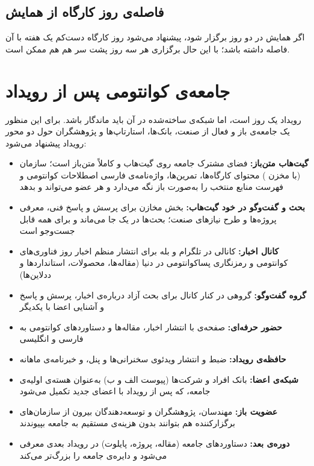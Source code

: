 \documentclass[a4paper,12pt]{article}
\begin{document}
	\subsection*{فاصله‌ی روز کارگاه از همایش}
	اگر همایش در دو روز برگزار شود، پیشنهاد می‌شود روز کارگاه دست‌کم یک هفته با آن فاصله داشته باشد؛
	با این حال برگزاری هر سه روز پشت سر هم هم ممکن است.

	\section{جامعه‌ی کوانتومی پس از رویداد}\label{sec:community}

	رویداد یک روز است، اما شبکه‌ی ساخته‌شده در آن باید ماندگار باشد. برای این منظور یک جامعه‌ی باز و فعال از صنعت، بانک‌ها،
	استارتاپ‌ها و پژوهشگران حول دو محور رویداد پیشنهاد می‌شود:
	\begin{itemize}[rightmargin=0.5cm, itemsep=4pt]
		\item \textbf{گیت‌هاب متن‌باز:} فضای مشترک جامعه روی گیت‌هاب و کاملاً متن‌باز است؛ سازمان  (با مخزن )
		محتوای کارگاه‌ها، تمرین‌ها، واژه‌نامه‌ی فارسی اصطلاحات کوانتومی و فهرست منابع منتخب را به‌صورت باز نگه می‌دارد و هر عضو می‌تواند  و  بدهد
		\item \textbf{بحث و گفت‌وگو در خود گیت‌هاب:} بخش  مخازن برای پرسش و پاسخ فنی، معرفی پروژه‌ها و طرح نیازهای صنعت؛ بحث‌ها در یک جا می‌ماند و برای همه قابل جست‌وجو است
		\item \textbf{کانال اخبار:} کانالی در تلگرام و بله برای انتشار منظم اخبار روز فناوری‌های کوانتومی و رمزنگاری پساکوانتومی در دنیا (مقاله‌ها، محصولات، استانداردها و ددلاین‌ها)
		\item \textbf{گروه گفت‌وگو:} گروهی در کنار کانال برای بحث آزاد درباره‌ی اخبار، پرسش و پاسخ و آشنایی اعضا با یکدیگر
		\item \textbf{حضور حرفه‌ای:} صفحه‌ی  با انتشار اخبار، مقاله‌ها و دستاوردهای کوانتومی به فارسی و انگلیسی
		\item \textbf{حافظه‌ی رویداد:} ضبط و انتشار ویدئوی سخنرانی‌ها و پنل، و خبرنامه‌ی ماهانه
		\item \textbf{شبکه‌ی اعضا:} بانک افراد و شرکت‌ها (پیوست الف و ب) به‌عنوان هسته‌ی اولیه‌ی جامعه، که پس از رویداد با اعضای جدید تکمیل می‌شود
		\item \textbf{عضویت باز:} مهندسان، پژوهشگران و توسعه‌دهندگان بیرون از سازمان‌های برگزارکننده هم بتوانند بدون هزینه‌ی مستقیم به جامعه بپیوندند
		\item \textbf{دوره‌ی بعد:} دستاوردهای جامعه (مقاله، پروژه، پایلوت) در رویداد بعدی معرفی می‌شود و دایره‌ی جامعه را بزرگ‌تر می‌کند
	\end{itemize}
\end{document}
